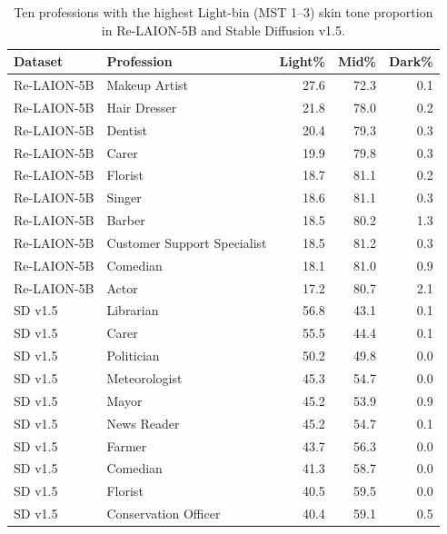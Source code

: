 \begin{table}[htbp]
	\centering
	\small
	\begin{tabular}{llrrr}
		\toprule
		\textbf{Dataset} & \textbf{Profession}         &
		\textbf{Light\%} & \textbf{Mid\%}              & \textbf{Dark\%}              \\
		\midrule
		Re-LAION-5B      & Makeup Artist               & 27.6            & 72.3 & 0.1 \\
		Re-LAION-5B      & Hair Dresser                & 21.8            & 78.0 & 0.2 \\
		Re-LAION-5B      & Dentist                     & 20.4            & 79.3 & 0.3 \\
		Re-LAION-5B      & Carer                       & 19.9            & 79.8 & 0.3 \\
		Re-LAION-5B      & Florist                     & 18.7            & 81.1 & 0.2 \\
		Re-LAION-5B      & Singer                      & 18.6            & 81.1 & 0.3 \\
		Re-LAION-5B      & Barber                      & 18.5            & 80.2 & 1.3 \\
		Re-LAION-5B      & Customer Support Specialist & 18.5            & 81.2 & 0.3 \\
		Re-LAION-5B      & Comedian                    & 18.1            & 81.0 & 0.9 \\
		Re-LAION-5B      & Actor                       & 17.2            & 80.7 & 2.1 \\
		\midrule
		SD v1.5          & Librarian                   & 56.8            & 43.1 & 0.1 \\
		SD v1.5          & Carer                       & 55.5            & 44.4 & 0.1 \\
		SD v1.5          & Politician                  & 50.2            & 49.8 & 0.0 \\
		SD v1.5          & Meteorologist               & 45.3            & 54.7 & 0.0 \\
		SD v1.5          & Mayor                       & 45.2            & 53.9 & 0.9 \\
		SD v1.5          & News Reader                 & 45.2            & 54.7 & 0.1 \\
		SD v1.5          & Farmer                      & 43.7            & 56.3 & 0.0 \\
		SD v1.5          & Comedian                    & 41.3            & 58.7 & 0.0 \\
		SD v1.5          & Florist                     & 40.5            & 59.5 & 0.0 \\
		SD v1.5          & Conservation Officer        & 40.4            & 59.1 & 0.5 \\
		\bottomrule
	\end{tabular}
	\caption{Ten professions with the highest Light-bin (MST
		1--3) skin tone proportion in Re-LAION-5B and Stable
		Diffusion v1.5.}
	\label{tab:top_biased_professions_skin}
\end{table}

